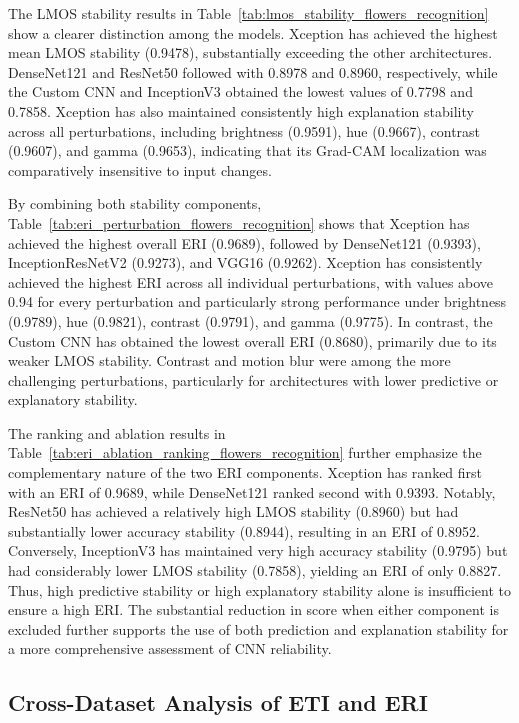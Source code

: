 \documentclass[a4paper,fleqn]{cas-dc}
\begin{document}
The LMOS stability results in Table~\ref{tab:lmos_stability_flowers_recognition} show a clearer distinction among the models. Xception has achieved the highest mean LMOS stability (0.9478), substantially exceeding the other architectures. DenseNet121 and ResNet50 followed with 0.8978 and 0.8960, respectively, while the Custom CNN and InceptionV3 obtained the lowest values of 0.7798 and 0.7858. Xception has also maintained consistently high explanation stability across all perturbations, including brightness (0.9591), hue (0.9667), contrast (0.9607), and gamma (0.9653), indicating that its Grad-CAM localization was comparatively insensitive to input changes.

By combining both stability components, Table~\ref{tab:eri_perturbation_flowers_recognition} shows that Xception has achieved the highest overall ERI (0.9689), followed by DenseNet121 (0.9393), InceptionResNetV2 (0.9273), and VGG16 (0.9262). Xception has consistently achieved the highest ERI across all individual perturbations, with values above 0.94 for every perturbation and particularly strong performance under brightness (0.9789), hue (0.9821), contrast (0.9791), and gamma (0.9775). In contrast, the Custom CNN has obtained the lowest overall ERI (0.8680), primarily due to its weaker LMOS stability. Contrast and motion blur were among the more challenging perturbations, particularly for architectures with lower predictive or explanatory stability.

The ranking and ablation results in Table~\ref{tab:eri_ablation_ranking_flowers_recognition} further emphasize the complementary nature of the two ERI components. Xception has ranked first with an ERI of 0.9689, while DenseNet121 ranked second with 0.9393. Notably, ResNet50 has achieved a relatively high LMOS stability (0.8960) but had substantially lower accuracy stability (0.8944), resulting in an ERI of 0.8952. Conversely, InceptionV3 has maintained very high accuracy stability (0.9795) but had considerably lower LMOS stability (0.7858), yielding an ERI of only 0.8827. Thus, high predictive stability or high explanatory stability alone is insufficient to ensure a high ERI. The substantial reduction in score when either component is excluded further supports the use of both prediction and explanation stability for a more comprehensive assessment of CNN reliability. 

\subsection{Cross-Dataset Analysis of ETI and ERI}
\end{document}
